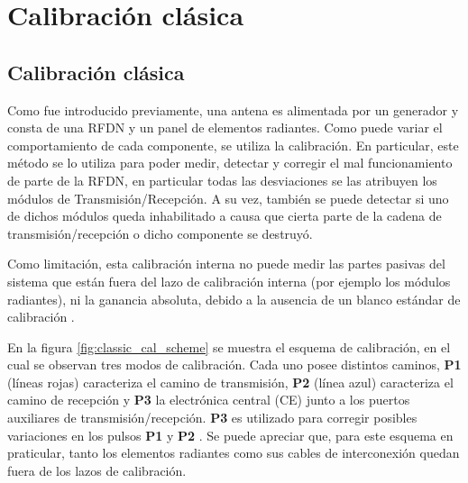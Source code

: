 
\chapter{Calibración clásica}
\label{ch:classicalCalibration}

\section{Calibración clásica}

Como fue introducido previamente, una antena es alimentada por un generador y consta de una RFDN y un panel de elementos 
radiantes. Como puede variar el comportamiento de cada componente, se utiliza la calibración. En particular, este método se 
lo utiliza para poder medir, detectar y corregir el mal funcionamiento de parte de la RFDN, en particular todas las desviaciones
se las atribuyen los módulos de Transmisión/Recepción. A su vez, también se puede detectar si uno de dichos módulos queda 
inhabilitado a causa que cierta parte de la cadena de transmisión/recepción o dicho componente se destruyó.

Como limitación, esta calibración interna no puede medir las partes pasivas del sistema que están fuera del lazo de
calibración interna (por ejemplo los módulos radiantes), ni la ganancia absoluta, debido a la ausencia de un blanco estándar
de calibración \cite{Wang2010}.

En la figura \ref{fig:classic_cal_scheme} se muestra el esquema de calibración, en el cual se observan tres modos de
calibración. Cada uno posee distintos caminos, \textbf{P1} (líneas rojas) caracteriza el camino de transmisión, \textbf{P2}
(línea azul) caracteriza el camino de recepción y \textbf{P3} la electrónica central (CE) junto a los puertos auxiliares de
transmisión/recepción. \textbf{P3} es utilizado para corregir posibles variaciones en los pulsos \textbf{P1} y \textbf{P2}
\cite{Makhoul2012}. Se puede apreciar que, para este esquema en praticular, tanto los elementos radiantes como sus cables de 
interconexión quedan fuera de los lazos de calibración.

